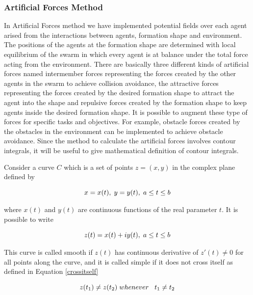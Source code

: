 \subsubsection{Artificial Forces Method} \label{Artificial Forces Ref} \label{Artificial_forces_ref}
In Artificial Forces method we have implemented potential fields over each agent arised from the interactions between agents, formation shape and environment. The positions of the agents at the formation shape  are determined with local equilibrium of the swarm in which every agent is at balance under the total force acting from the environment. There are basically three different kinds of artificial forces named intermember forces representing the forces created by the other agents in the swarm to achieve collision avoidance, the attractive forces representing the forces created by the desired formation shape to attract the agent into the shape and repulsive forces created by the formation shape to keep agents inside the desired formation shape. It is possible to augment these type of forces for specific tasks and objectives. For example, obstacle forces created by the obstacles in the environment can be implemented to achieve obstacle avoidance. Since the method to calculate the artificial forces involves contour integrals, it will be useful to give mathematical definition of contour integrals.
		
Consider a curve $C$ which is a set of points $z = (x,y)$ in the complex plane defined by \cite{wiki_contour}

\begin{equation}
x = x(t),   \hspace{0.1cm} y = y(t),  \hspace{0.1cm} a\leq t \leq b
\end{equation}

where $x(t)$ and $y(t)$ are continuous functions of the real parameter $t$.  It is possible to write
		
\begin{equation}
z(t) = x(t)+iy(t),   \hspace{0.1cm} a\leq t \leq b
\end{equation}
		
This curve is called smooth if $z(t)$ has continuous derivative of $z'(t) \neq 0$ for all points along the curve, and it is called simple if it does not cross itself as defined in Equation \ref{crossitself}

\begin{equation} \label{crossitself}
z(t_1) \neq z(t_2)   \hspace{0.1cm} whenever   \hspace{0.3cm} t_1\neq t_2
\end{equation}
		
